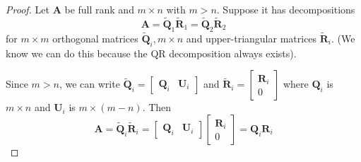 \begin{proof}
    Let $\boldsymbol{A}$ be full rank and $m \times n$ with $m>n$. Suppose it has decompositions
$$
\boldsymbol{A}=\tilde{\boldsymbol{Q}}_{1} \tilde{\boldsymbol{R}}_{1}=\tilde{\boldsymbol{Q}}_{2} \tilde{\boldsymbol{R}}_{2}
$$
for $m \times m$ orthogonal matrices $\tilde{\boldsymbol{Q}}_{i}, m \times n$ and upper-triangular matrices $\tilde{\boldsymbol{R}}_{i}$. (We know we can do this because the QR decomposition always exists).

Since $m>n$, we can write $\tilde{\boldsymbol{Q}}_{i}=\left[\begin{array}{ll}\boldsymbol{Q}_{i} & \boldsymbol{U}_{i}\end{array}\right]$ and $\tilde{\boldsymbol{R}}_{i}=\left[\begin{array}{c}\boldsymbol{R}_{i} \\ 0\end{array}\right]$ where $\boldsymbol{Q}_{i}$ is $m \times n$ and $\boldsymbol{U}_{i}$ is $m \times(m-n)$. Then
$$
\boldsymbol{A}=\tilde{\boldsymbol{Q}}_{i} \tilde{\boldsymbol{R}}_{i}=\left[\begin{array}{ll}
\boldsymbol{Q}_{i} & \boldsymbol{U}_{i}
\end{array}\right]\left[\begin{array}{c}
\boldsymbol{R}_{i} \\
0
\end{array}\right]=\boldsymbol{Q}_{i} \boldsymbol{R}_{i}
$$


\end{proof}
